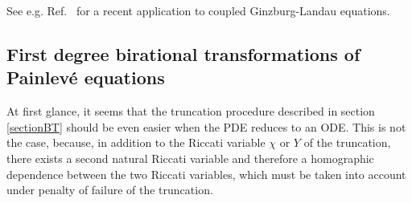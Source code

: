 \documentclass[10pt]{article}
\begin{document}
See e.g. Ref.~\cite{CM2000b} for a recent application to coupled
Ginzburg-Landau equations.

\subsection{First degree birational transformations of Painlev\'e equations}

At first glance,
it seems that the truncation procedure described in section \ref{sectionBT}
should be even easier when the PDE reduces to an ODE.
This is not the case, because, in addition to the Riccati variable
$\chi$ or $Y$ of the truncation,
there exists a second natural Riccati variable
and therefore a homographic dependence between the two Riccati variables,
which must be taken into account under penalty of failure of
the truncation.
\end{document}
